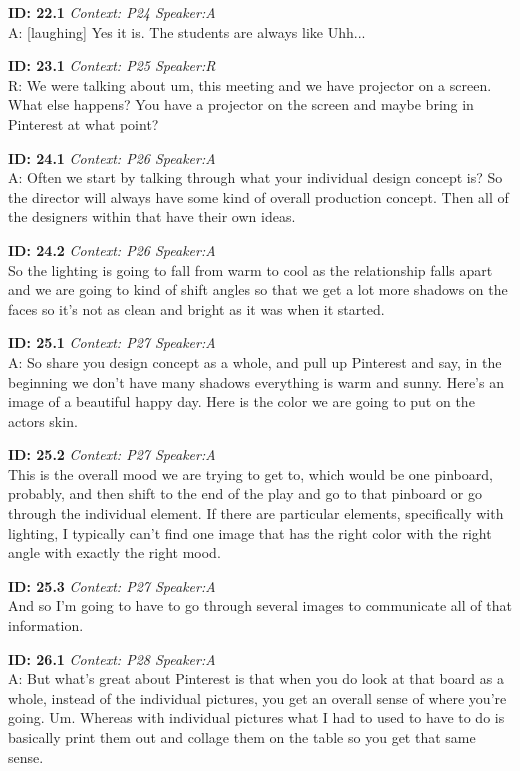 \documentclass[10pt]{book}
\begin{document}
\begin{landscape}
\textbf{ID: 22.1} \emph{Context: P24 Speaker:A}\\ 
A: [laughing] Yes it is. The students are always like Uhh... \newpage 

\textbf{ID: 23.1} \emph{Context: P25 Speaker:R}\\ 
R: We were talking about um, this meeting and we have projector on a screen. What else happens? You have a projector on the screen and maybe bring in Pinterest at what point? \newpage 

\textbf{ID: 24.1} \emph{Context: P26 Speaker:A}\\ 
A: Often we start by talking through what your individual design concept is? So the director will always have some kind of overall production concept. Then all of the designers within that have their own ideas. \newpage 

\textbf{ID: 24.2} \emph{Context: P26 Speaker:A}\\ 
So the lighting is going to fall from warm to cool as the relationship falls apart and we are going to kind of shift angles so that we get a lot more shadows on the faces so it's not as clean and bright as it was when it started. \newpage 

\textbf{ID: 25.1} \emph{Context: P27 Speaker:A}\\ 
A: So share you design concept as a whole, and pull up Pinterest and say, in the beginning we don't have many shadows everything is warm and sunny. Here's an image of a beautiful happy day. Here is the color we are going to put on the actors skin. \newpage 

\textbf{ID: 25.2} \emph{Context: P27 Speaker:A}\\ 
This is the overall mood we are trying to get to, which would be one pinboard, probably, and then shift to the end of the play and go to that pinboard or go through the individual element. If there are particular elements, specifically with lighting, I typically can't find one image that has the right color with the right angle with exactly the right mood. \newpage 

\textbf{ID: 25.3} \emph{Context: P27 Speaker:A}\\ 
And so I'm going to have to go through several images to communicate all of that information. \newpage 

\textbf{ID: 26.1} \emph{Context: P28 Speaker:A}\\ 
A: But what's great about Pinterest is that when you do look at that board as a whole, instead of the individual pictures, you get an overall sense of where you're going. Um. Whereas with individual pictures what I had to used to have to do is basically print them out and collage them on the table so you get that same sense. \newpage 


\end{landscape}
\end{document}
